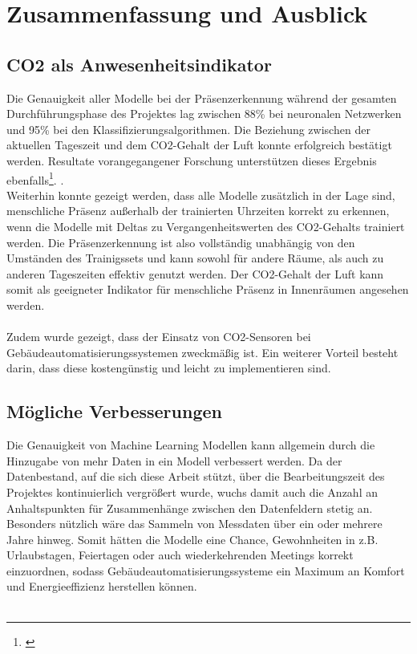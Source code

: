 \clearpage
\chapter{\textbf{Zusammenfassung und Ausblick}}\label{zusammenfassung}

\section{CO2 als Anwesenheitsindikator}
Die Genauigkeit aller Modelle bei der Präsenzerkennung während der gesamten Durchführungsphase des Projektes 
lag zwischen 88\% bei neuronalen Netzwerken und 95\% bei den Klassifizierungsalgorithmen. 
Die Beziehung zwischen der aktuellen Tageszeit und dem CO2-Gehalt der Luft konnte erfolgreich bestätigt 
werden. Resultate vorangegangener Forschung unterstützen dieses Ergebnis ebenfalls\footnote[1]{\cite{IPPR}}.
.\\
Weiterhin konnte gezeigt werden, dass alle Modelle zusätzlich in der Lage sind, menschliche Präsenz außerhalb
der trainierten Uhrzeiten korrekt zu erkennen, wenn die Modelle mit Deltas zu Vergangenheitswerten des 
CO2-Gehalts trainiert werden. Die Präsenzerkennung ist also vollständig unabhängig von den Umständen des
Trainigssets und kann sowohl für andere Räume, als auch zu anderen Tageszeiten effektiv genutzt werden. 
Der CO2-Gehalt der Luft kann somit als geeigneter Indikator für menschliche Präsenz in Innenräumen angesehen 
werden.\\\\
Zudem wurde gezeigt, dass der Einsatz von CO2-Sensoren bei Gebäudeautomatisierungssystemen zweckmäßig ist.
Ein weiterer Vorteil besteht darin, dass diese kostengünstig und leicht zu implementieren sind.


\section{Mögliche Verbesserungen}
Die Genauigkeit von Machine Learning Modellen kann allgemein durch die Hinzugabe von mehr Daten in ein Modell 
verbessert werden. 
Da der Datenbestand, auf die sich diese Arbeit stützt, über die Bearbeitungszeit des Projektes 
kontinuierlich vergrößert wurde, wuchs damit auch die Anzahl an Anhaltspunkten für Zusammenhänge zwischen den 
Datenfeldern stetig an. Besonders nützlich wäre das Sammeln von Messdaten über ein oder mehrere Jahre hinweg.
Somit hätten die Modelle eine Chance, Gewohnheiten in z.B. Urlaubstagen, Feiertagen oder auch wiederkehrenden
Meetings korrekt einzuordnen, sodass Gebäudeautomatisierungssysteme ein Maximum an Komfort und Energieeffizienz
herstellen können.\\\\

